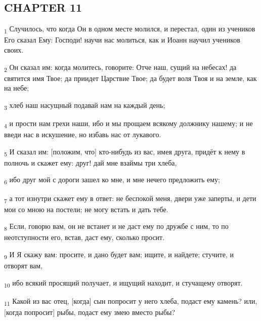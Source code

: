 \subsection{CHAPTER 11}
\begin{tcolorbox}
\textsubscript{1} Случилось, что когда Он в одном месте молился, и перестал, один из учеников Его сказал Ему: Господи! научи нас молиться, как и Иоанн научил учеников своих.
\end{tcolorbox}
\begin{tcolorbox}
\textsubscript{2} Он сказал им: когда молитесь, говорите: Отче наш, сущий на небесах! да святится имя Твое; да приидет Царствие Твое; да будет воля Твоя и на земле, как на небе;
\end{tcolorbox}
\begin{tcolorbox}
\textsubscript{3} хлеб наш насущный подавай нам на каждый день;
\end{tcolorbox}
\begin{tcolorbox}
\textsubscript{4} и прости нам грехи наши, ибо и мы прощаем всякому должнику нашему; и не введи нас в искушение, но избавь нас от лукавого.
\end{tcolorbox}
\begin{tcolorbox}
\textsubscript{5} И сказал им: [положим, что] кто-нибудь из вас, имея друга, придёт к нему в полночь и скажет ему: друг! дай мне взаймы три хлеба,
\end{tcolorbox}
\begin{tcolorbox}
\textsubscript{6} ибо друг мой с дороги зашел ко мне, и мне нечего предложить ему;
\end{tcolorbox}
\begin{tcolorbox}
\textsubscript{7} а тот изнутри скажет ему в ответ: не беспокой меня, двери уже заперты, и дети мои со мною на постели; не могу встать и дать тебе.
\end{tcolorbox}
\begin{tcolorbox}
\textsubscript{8} Если, говорю вам, он не встанет и не даст ему по дружбе с ним, то по неотступности его, встав, даст ему, сколько просит.
\end{tcolorbox}
\begin{tcolorbox}
\textsubscript{9} И Я скажу вам: просите, и дано будет вам; ищите, и найдете; стучите, и отворят вам,
\end{tcolorbox}
\begin{tcolorbox}
\textsubscript{10} ибо всякий просящий получает, и ищущий находит, и стучащему отворят.
\end{tcolorbox}
\begin{tcolorbox}
\textsubscript{11} Какой из вас отец, [когда] сын попросит у него хлеба, подаст ему камень? или, [когда попросит] рыбы, подаст ему змею вместо рыбы?
\end{tcolorbox}
